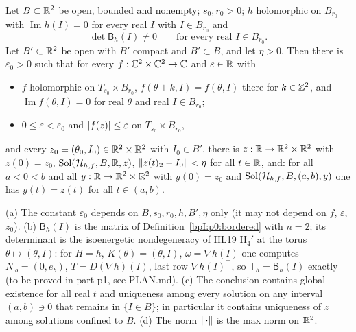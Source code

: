 \begin{theorem}\label{bpI:p0:head}
Let $B\subset\mathbb{R}^2$ be open, bounded and nonempty; $s_0,r_0>0$; $h$ holomorphic on $B_{r_0}$ with
$\operatorname{Im}h(I)=0$ for every real $I$ with $I\in B_{r_0}$ and
\[\det\mathsf B_h(I)\ne0\qquad\text{for every real }I\in B_{r_0}.\]
Let $B'\subset\mathbb{R}^2$ be open with $\overline{B'}$ compact and $\overline{B'}\subset B$, and let $\eta>0$. Then there is
$\varepsilon_0>0$ such that for every $f:\mathbb{C}^2\times\mathbb{C}^2\to\mathbb{C}$ and $\varepsilon\in\mathbb{R}$ with
\begin{itemize}
\item $f$ holomorphic on $T_{s_0}\times B_{r_0}$, $f(\theta+k,I)=f(\theta,I)$ there for $k\in\mathbb{Z}^2$, and $\operatorname{Im}f(\theta,I)=0$
  for real $\theta$ and real $I\in B_{r_0}$;
\item $0\le\varepsilon<\varepsilon_0$ and $\lvert f(z)\rvert\le\varepsilon$ on $T_{s_0}\times B_{r_0}$,
\end{itemize}
and every $z_0=(\theta_0,I_0)\in\mathbb{R}^2\times\mathbb{R}^2$ with $I_0\in B'$, there is $z:\mathbb{R}\to\mathbb{R}^2\times\mathbb{R}^2$ with $z(0)=z_0$,
$\mathrm{Sol}(\mathcal H_{h,f},B,\mathbb{R},z)$, $\lVert z(t)_2-I_0\rVert<\eta$ for all $t\in\mathbb{R}$, and:
for all $a<0<b$ and all $y:\mathbb{R}\to\mathbb{R}^2\times\mathbb{R}^2$ with $y(0)=z_0$ and $\mathrm{Sol}(\mathcal H_{h,f},B,(a,b),y)$ one has
$y(t)=z(t)$ for all $t\in(a,b)$.
\end{theorem}

\begin{remark}\label{bpI:p0:head-remarks}
(a) The constant $\varepsilon_0$ depends on $B,s_0,r_0,h,B',\eta$ only (it may not depend on $f$, $\varepsilon$, $z_0$).
(b) $\mathsf B_h(I)$ is the matrix of Definition~\ref{bpI:p0:bordered} with $n=2$; its determinant is the
isoenergetic nondegeneracy of HL19 H$_4'$ at the torus $\theta\mapsto(\theta,I)$: for $H=h$, $K(\theta)=(\theta,I)$,
$\omega=\nabla h(I)$ one computes $N_{\cdot b}=(0,e_b)$, $T=D(\nabla h)(I)$, last row $\nabla h(I)^\top$, so
$\mathsf T_h=\mathsf B_h(I)$ exactly (to be proved in part p1, see PLAN.md).
(c) The conclusion contains global existence for all real $t$ and uniqueness among every solution on any interval
$(a,b)\ni0$ that remains in $\{I\in B\}$; in particular it contains uniqueness of $z$ among solutions confined to $B$.
(d) The norm $\lVert \cdot\rVert$ is the max norm on $\mathbb{R}^2$.
\end{remark}

